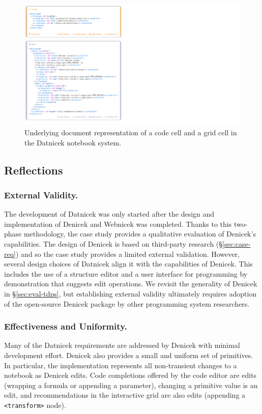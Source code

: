\documentclass[sigconf]{acmart}
\newcommand{\diff}[1]{{#1}}
\newcommand{\note}[1]{}
\begin{document}
\begin{figure}[t]
\includegraphics[width=0.9\columnwidth,clip,trim=0cm 0.7cm 18.5cm 0.2cm]{fig/source.pdf}
\caption{Underlying document representation of a code cell and a grid cell in the Datnicek
notebook system.}
\label{fig:source}
\end{figure}


\subsection{Reflections}
\label{sec:case-reflection}

\subsubsection*{External Validity.}
The development of Datnicek was only started after the design and implementation of Denicek and
Webnicek was completed. Thanks to this two-phase methodology, the case study provides
a qualitative evaluation of Denicek's capabilities. \diff{The design of Denicek is based
on third-party research (\S\ref{sec:case-req}) and so the case study provides a limited external
validation. However, several design choices of Datnicek align it with the capabilities of Denicek.
This includes the use of a structure editor and
a user interface for programming by demonstration that suggests edit operations. We revisit the
generality of Denicek in \S\ref{sec:eval-tdps}, but establishing external validity ultimately
requires adoption of the open-source Denicek package by other programming system researchers.}
\note{Added discussion on external validity - although this is necessarilly limited.}

\subsubsection*{Effectiveness and Uniformity.}
Many of the Datnicek requirements are addressed by Denicek with minimal development
effort. Denicek also provides a small and uniform set of primitives. In particular,
the implementation represents all non-transient changes to a notebook as Denicek edits.
Code completions offered by the code editor are edits (wrapping a formula or appending a parameter),
changing a primitive value is an edit, and recommendations in the interactive grid are also edits
(appending a {\small\Verb_<transform>_} node).
\end{document}
